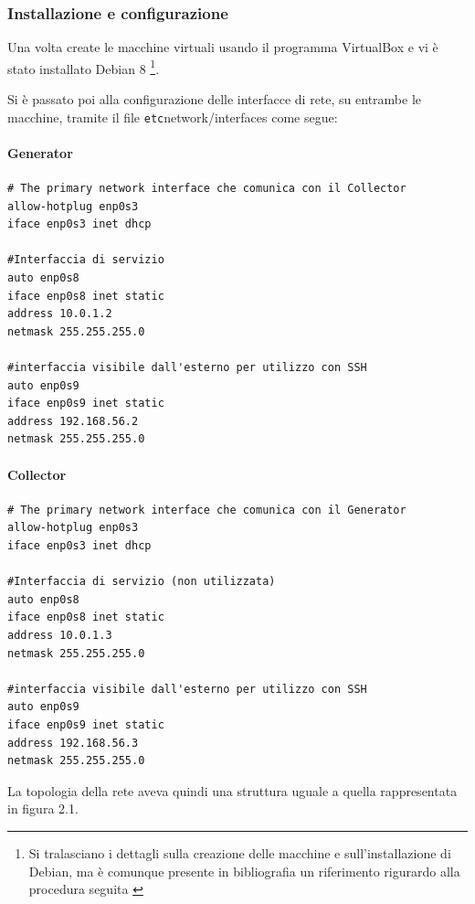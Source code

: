 \documentclass[12pt,a4paper,openright,twoside]{report}
\begin{document}
\subsubsection{Installazione e configurazione}

Una volta create le macchine virtuali usando il programma VirtualBox \cite{EXP1} e vi \`e stato
installato Debian 8 \footnote{Si tralasciano i dettagli sulla creazione delle macchine e sull'installazione
di Debian, ma \`e comunque presente in bibliografia un riferimento rigurardo alla procedura seguita \cite{EXP10} \cite{EXP11} }.

Si \`e passato poi alla configurazione delle interfacce di rete, su entrambe le macchine, tramite il file \linebreak
{\verb /etc/network/interfaces }  come segue:

\paragraph{Generator}
\begin{verbatim}
# The primary network interface che comunica con il Collector
allow-hotplug enp0s3
iface enp0s3 inet dhcp

#Interfaccia di servizio
auto enp0s8
iface enp0s8 inet static
address 10.0.1.2
netmask 255.255.255.0

#interfaccia visibile dall'esterno per utilizzo con SSH
auto enp0s9
iface enp0s9 inet static
address 192.168.56.2
netmask 255.255.255.0

\end{verbatim}
\paragraph{Collector}
\begin{verbatim}
# The primary network interface che comunica con il Generator
allow-hotplug enp0s3
iface enp0s3 inet dhcp

#Interfaccia di servizio (non utilizzata)
auto enp0s8
iface enp0s8 inet static
address 10.0.1.3
netmask 255.255.255.0

#interfaccia visibile dall'esterno per utilizzo con SSH
auto enp0s9
iface enp0s9 inet static
address 192.168.56.3
netmask 255.255.255.0

\end{verbatim}

La topologia della rete aveva quindi una struttura uguale a quella rappresentata
in figura 2.1.
\end{document}
